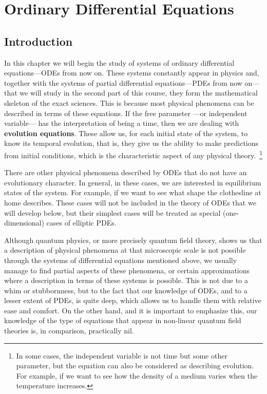 \chapter{Ordinary Differential Equations}
\label{Ecuaciones_Diferenciales_Ordinarias}




\section{Introduction}

In this chapter we will begin the study of systems of 
ordinary differential equations---ODEs from now on.
These systems constantly appear in physics and, together with
the systems of partial differential equations---PDEs
from now on---that we will study in the second part of this course, they
form the mathematical skeleton of the exact sciences. This is because
most physical phenomena can be
described in terms of these equations. 
If the free parameter ---or independent variable--- has the
interpretation of being a time, then we are dealing with
{\bf evolution equations}. 
These allow us, for each initial state of the system, 
to know its temporal evolution, that is, they give us the ability to
make predictions from initial conditions, which is the
characteristic aspect of any physical theory.~\footnote{
In some cases, the independent variable is not time
but some other parameter, but the equation can also be 
considered as describing evolution. For
example, if we want to see how the density of a medium varies when
the temperature increases.}

There are other physical phenomena described by ODEs that do not have
an evolutionary character. In general, in these cases, we are
interested in equilibrium states of the system. 
For example, if we want to see what shape the clothesline at home describes.
These cases will not be included in the
theory of ODEs that we will develop below, but 
their simplest cases will be
treated as special (one-dimensional) cases of elliptic PDEs.


Although quantum physics, or more precisely quantum field theory,
shows us that a description of physical phenomena
at that microscopic scale is not possible through the systems of
differential equations mentioned above, we usually manage
to find partial aspects of these phenomena, or certain
approximations where a description in terms
of these systems is possible. This is not due to a whim or stubbornness, 
but to the fact that
our knowledge of ODEs, and to a lesser extent of PDEs, is
quite deep, which allows us to handle them with relative ease
and comfort.
On the other hand, and it is important to emphasize this, our knowledge of the
type of equations that appear in non-linear quantum field theories
is, in comparison, practically nil.



